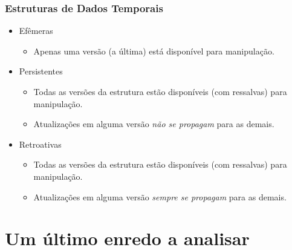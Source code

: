 \documentclass[brazil]{beamer}
\begin{document}
    \begin{frame}
        \frametitle{Estruturas de Dados Temporais}

        \begin{itemize}
            \item Efêmeras
            \begin{itemize}[<2->]
                \item Apenas uma versão (a última) está disponível para manipulação.
            \end{itemize}
            \item Persistentes
            \begin{itemize}[<3->]
                \item Todas as versões da estrutura estão disponíveis (com ressalvas) para manipulação.
                \item Atualizações em alguma versão {\em não se propagam} para as demais.
            \end{itemize}
            \item Retroativas
            \begin{itemize}[<4->]
                \item Todas as versões da estrutura estão disponíveis (com ressalvas) para manipulação.
                \item Atualizações em alguma versão {\em sempre se propagam} para as demais.
            \end{itemize}
        \end{itemize}
    \end{frame}

\section{Um último enredo a analisar}
\end{document}
